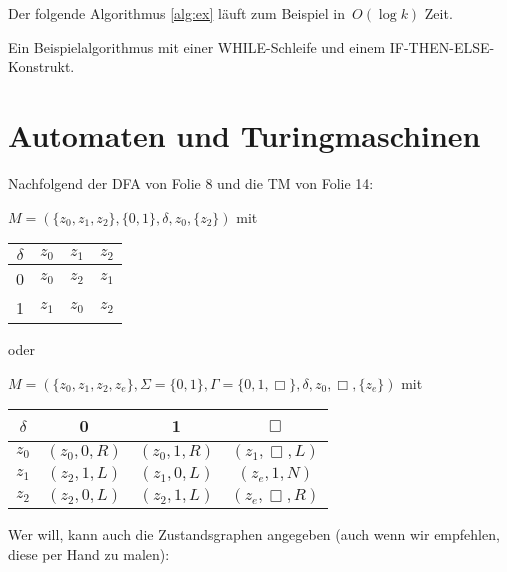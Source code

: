 \documentclass[a4paper,onecolumn,oneside,12pt,ngerman]{article}
\theoremstyle{plain} %
\theoremstyle{definition} %
\theoremstyle{remark} %
\theoremstyle{plain}
\begin{document}
\noindent Der folgende Algorithmus \cref{alg:ex} läuft zum Beispiel in~$O(\log k)$ Zeit.

\begin{algorithm}[H]
\caption{Ein Beispielalgorithmus mit einer WHILE-Schleife und einem IF-THEN-ELSE-Konstrukt.}
\label{alg:ex}
\end{algorithm}

\section{Automaten und Turingmaschinen}


Nachfolgend der DFA von Folie 8 und die TM von Folie 14:


$M=(\{z_0,z_1,z_2\}, \{ 0,1\}, \delta, z_0, \{z_2\})$ mit
\begin{center}
	\begin{tabular}[t]{c|ccc}
		$\delta$ & $z_0$ & $z_1$ & $z_2$ \\ \hline
		0 & $z_0$ & $z_2$ & $z_1$ \\
		1 & $z_1$ & $z_0$ & $z_2$
	\end{tabular}
\end{center}

oder

$M=(\{z_0,z_1,z_2,z_e\}, \Sigma=\{ 0,1\}, \Gamma =\{ 0,1,\Box\},\delta, z_0, \Box,\{ z_e\})$ mit
\begin{center}
	\begin{tabular}{c|ccc}
		$\delta$ & 0 & 1 & $\Box$ \\ \hline
		$z_0$ & $(z_0,0,R)$ & $(z_0,1,R)$ & $(z_1,\Box,L)$ \\
		$z_1$ & $(z_2,1,L)$ & $(z_1,0,L)$ & $(z_e,1,N)$ \\
		$z_2$ & $(z_2,0,L)$ & $(z_2,1,L)$ & $(z_e,\Box,R)$ \\
	\end{tabular}
\end{center}

Wer will, kann auch die Zustandsgraphen angegeben (auch wenn wir empfehlen, diese per Hand zu malen):

\end{document}
